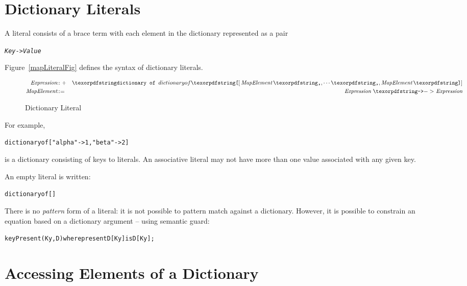 \section{Dictionary Literals}
\label{mapLiteral}
A  literal consists of a  brace term with each element in the dictionary represented as a pair 
\begin{alltt}
\emph{Key} -> \emph{Value}
\end{alltt}
Figure~\vref{mapLiteralFig} defines the syntax of dictionary literals.
\begin{figure}[htbp]
\begin{eqnarray*}
\emph{Expression}&\arrowplus&\q{dictionary of }\q{[}\,\emph{MapElement}\sequence{,}\emph{MapElement}\,\q{]}\\
\emph{MapElement}&\arrow&\emph{Expression}\ \q{->}\ \emph{Expression}
\end{eqnarray*}
\caption{Dictionary Literal}
\label{mapLiteralFig}
\end{figure}
For example,
\begin{alltt}
dictionary of ["alpha" -> 1, "beta"->2]
\end{alltt}
is a dictionary consisting of  keys to  literals.
An associative  literal may not have more than one value associated with any given key.

An empty  literal is written:
\begin{alltt}
dictionary of []
\end{alltt}

\begin{aside}
There is no \emph{pattern} form of a  literal: it is not possible to pattern match against a dictionary. However, it is possible to constrain an equation based on a dictionary argument -- using semantic guard:
\begin{alltt}
keyPresent(Ky,D) where present D[Ky] is D[Ky];
\end{alltt}
\end{aside}


\section{Accessing Elements of a Dictionary}
\label{associativeMapAccess}


